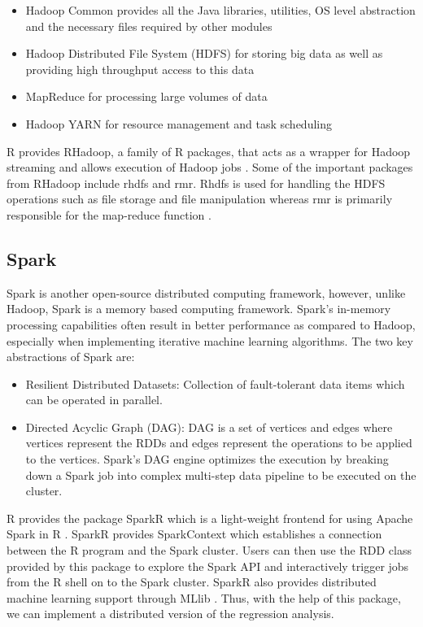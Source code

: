 \documentclass[sigconf]{acmart}
\begin{document}
\begin{itemize}
    \item Hadoop Common provides all the Java libraries, utilities, OS level abstraction and the necessary files required by other modules
    \item Hadoop Distributed File System (HDFS) for storing big data as well as providing high throughput access to this data
    \item MapReduce for processing large volumes of data
    \item Hadoop YARN for resource management and task scheduling
\end{itemize}

R provides RHadoop, a family of R packages, that acts as a wrapper for Hadoop streaming and allows execution of Hadoop jobs \cite{log-reg}. Some of the important packages from RHadoop include rhdfs and rmr. Rhdfs is used for handling the HDFS operations such as file storage and file manipulation whereas rmr is primarily responsible for the map-reduce function \cite{log-reg}.

\subsection{Spark} 
Spark is another open-source distributed computing framework, however, unlike Hadoop, Spark is a memory based computing framework. Spark's in-memory processing capabilities often result in better performance as compared to Hadoop, especially when implementing iterative machine learning algorithms. The two key abstractions of Spark are:

\begin{itemize}
    \item Resilient Distributed Datasets: Collection of fault-tolerant data items which can be operated in parallel.
    \item Directed Acyclic Graph (DAG): DAG is a set of vertices and edges where vertices represent the RDDs and edges represent the operations to be applied to the vertices. Spark's DAG engine optimizes the execution by breaking down a Spark job into complex multi-step data pipeline to be executed on the cluster.
\end{itemize}

R provides the package SparkR which is a light-weight frontend for using Apache Spark in R \cite{log-reg}. SparkR provides SparkContext which establishes a connection between the R program and the Spark cluster. Users can then use the RDD class provided by this package to explore the Spark API and interactively trigger jobs from the R shell on to the Spark cluster. SparkR also provides distributed machine learning support through MLlib \cite{log-reg}. Thus, with the help of this package, we can implement a distributed version of the regression analysis.
\end{document}
